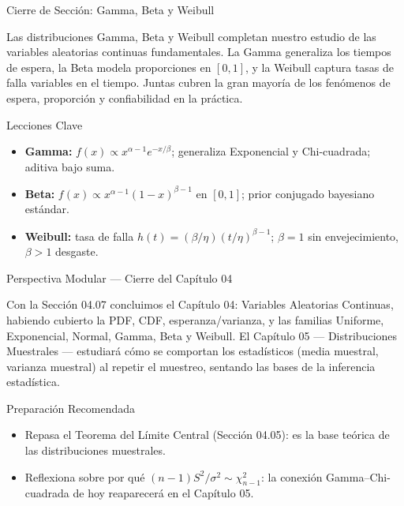 \documentclass[10pt, aspectratio=169]{beamer}
\begin{document}
\begin{frame}{Cierre de Sección: Gamma, Beta y Weibull}
  \begin{reflexion}
    Las distribuciones Gamma, Beta y Weibull completan nuestro estudio de las variables aleatorias continuas fundamentales. La Gamma generaliza los tiempos de espera, la Beta modela proporciones en $[0,1]$, y la Weibull captura tasas de falla variables en el tiempo. Juntas cubren la gran mayoría de los fenómenos de espera, proporción y confiabilidad en la práctica.
  \end{reflexion}

  \vspace{0.2cm}
  \pause
  \begin{block}{Lecciones Clave}
    \begin{itemize}\itemsep=0.08cm
      \item \textbf{Gamma:} $f(x) \propto x^{\alpha-1}e^{-x/\beta}$; generaliza Exponencial y Chi-cuadrada; aditiva bajo suma.
      \item \textbf{Beta:} $f(x) \propto x^{\alpha-1}(1-x)^{\beta-1}$ en $[0,1]$; prior conjugado bayesiano estándar.
      \item \textbf{Weibull:} tasa de falla $h(t) = (\beta/\eta)(t/\eta)^{\beta-1}$; $\beta=1$ sin envejecimiento, $\beta>1$ desgaste.
    \end{itemize}
  \end{block}
\end{frame}

\begin{frame}{Perspectiva Modular --- Cierre del Capítulo 04}
  \scriptsize
  \begin{retoclase}
    Con la Sección 04.07 concluimos el Capítulo 04: Variables Aleatorias Continuas, habiendo cubierto la PDF, CDF, esperanza/varianza, y las familias Uniforme, Exponencial, Normal, Gamma, Beta y Weibull. El Capítulo 05 --- Distribuciones Muestrales --- estudiará cómo se comportan los estadísticos (media muestral, varianza muestral) al repetir el muestreo, sentando las bases de la inferencia estadística.
  \end{retoclase}

  \vspace{0.08cm}
  \pause
  \begin{alertblock}{Preparación Recomendada}
    \begin{itemize}\itemsep=0.06cm
      \item Repasa el Teorema del Límite Central (Sección 04.05): es la base teórica de las distribuciones muestrales.
      \item Reflexiona sobre por qué $(n-1)S^{2}/\sigma^{2} \sim \chi^{2}_{n-1}$: la conexión Gamma--Chi-cuadrada de hoy reaparecerá en el Capítulo 05.
    \end{itemize}
  \end{alertblock}
\end{frame}
\end{document}
